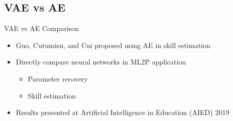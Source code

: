 \documentclass{beamer}
\theoremstyle{definition}
\begin{document}
\subsection{VAE vs AE}

\begin{frame}{VAE vs AE Comparison}
\begin{itemize}
  \item Guo, Cutumisu, and Cui proposed using AE in skill estimation
  \item Directly compare neural networks in ML2P application
  \begin{itemize}
    \item Parameter recovery
    \item Skill estimation
  \end{itemize}
  \item<2-> Results presented at Artificial Intelligence in Education (AIED) 2019
\end{itemize}
\end{frame}

\end{document}
